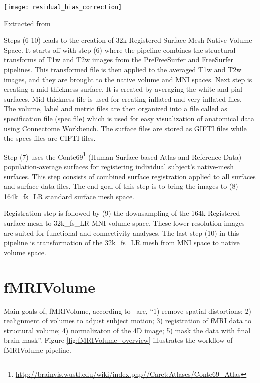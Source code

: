 \begin{center}
  \texttt{[image: residual\_bias\_correction]}
  \label{fig:residual_bias_correction}
  \caption*{Extracted from \cite{Gla13}}
\end{center}

Steps (6-10) leads to the creation of 32k Registered Surface Mesh Native Volume Space. It starts off with step (6) where the pipeline combines the structural transforms of T1w and T2w images from the PreFreeSurfer and FreeSurfer pipelines. This transformed file is then applied to the averaged T1w and T2w images, and they are brought to the native volume and MNI spaces. Next step is creating a mid-thickness surface. It is created by averaging the white and pial surfaces. Mid-thickness file is used for creating inflated and very inflated files. The volume, label and metric files are then organized into a file called as specification file (spec file) which is used for easy visualization of anatomical data using Connectome Workbench. The surface files are stored as GIFTI files while the specs files are CIFTI files.

Step (7) uses the Conte69\footnote{\url{http://brainvis.wustl.edu/wiki/index.php//Caret:Atlases/Conte69\_Atlas}} (Human Surface-based Atlas and Reference Data) population-average surfaces for registering individual subject's native-mesh surfaces. This step consists of combined surface registration applied to all surfaces and surface data files. The end goal of this step is to bring the images to (8) 164k\_fs\_LR standard surface mesh space. 

Registration step is followed by (9) the downsampling of the 164k Registered surface mesh to 32k\_fs\_LR MNI volume space. These lower resolution images are suited for functional and connectivity analyses. The last step (10) in this pipeline is transformation of the 32k\_fs\_LR mesh from MNI space to native volume space. 


\section{fMRIVolume} \label{sec:fMRIVolume}
Main goals of, fMRIVolume, according to~\cite{Gla13} are, ``1) remove spatial distortions; 2) realignment of volumes to adjust subject motion; 3) registration of fMRI data to structural volume; 4) normalizaton of the 4D image; 5) mask the data with final brain mask''. Figure \ref{fig:fMRIVolume_overview} illustrates the workflow of fMRIVolume pipeline.

